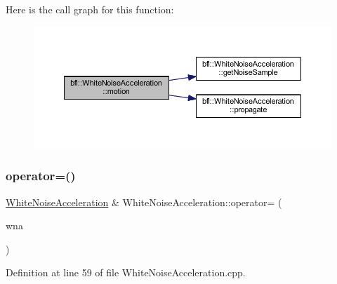 Here is the call graph for this function\+:
\nopagebreak
\begin{figure}[H]
\begin{center}
\leavevmode
\includegraphics[width=350pt]{classbfl_1_1WhiteNoiseAcceleration_addb79c08bdf08b89629bdcd24e46d1b8_cgraph}
\end{center}
\end{figure}
\mbox{\label{classbfl_1_1WhiteNoiseAcceleration_a6f69d09499e7a4746bd823db5fc5ceec}} 
\subsubsection{\texorpdfstring{operator=()}{operator=()}\hspace{0.1cm}{\footnotesize\ttfamily [1/2]}}
{\footnotesize\ttfamily \mbox{\hyperlink{classbfl_1_1WhiteNoiseAcceleration}{White\+Noise\+Acceleration}} \& White\+Noise\+Acceleration\+::operator= (\begin{DoxyParamCaption}\item[{const \mbox{\hyperlink{classbfl_1_1WhiteNoiseAcceleration}{White\+Noise\+Acceleration}} \&}]{wna }\end{DoxyParamCaption})}



Definition at line 59 of file White\+Noise\+Acceleration.\+cpp.

\mbox{\label{classbfl_1_1WhiteNoiseAcceleration_a4562a1dfc45dd143f7d05fea98e38f42}} 
